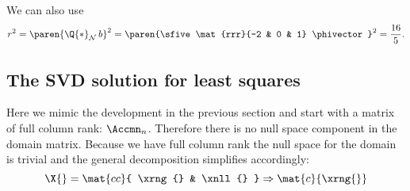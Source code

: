 We can also use
\begin{equation}
  r^{2} = \paren{ \Q{*}_{\mathcal{N}}\,b}^{2} = \paren{\sfive \mat{rrr}{-2 & 0 & 1} \phivector}^{2}= \frac{16}{5}.
\end{equation}


\subsection{The SVD solution for least squares}
Here we mimic the development in the previous section and start with a matrix of full column rank: $\Accmn_{n}$. Therefore there is no null space component in the domain matrix. Because we have full column rank the null space for the domain is trivial and the general decomposition simplifies accordingly:
\begin{equation}
  \X{} = \mat{cc}{ \xrng{} & \xnll{} } \Rightarrow \mat{c}{ \xrng{} }
\end{equation}

